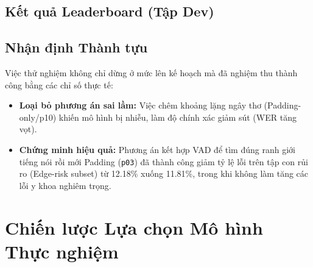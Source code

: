 \documentclass[12pt,a4paper]{article}
\begin{document}
\subsection{Kết quả Leaderboard (Tập Dev)}

\begin{table}[h]
\centering
\caption{Kết quả chạy ChunkFormer trên các biến thể tiền xử lý}
\end{table}

\subsection{Nhận định Thành tựu}
Việc thử nghiệm không chỉ dừng ở mức lên kế hoạch mà đã nghiệm thu thành công bằng các chỉ số thực tế:
\begin{itemize}[leftmargin=1.2cm]
    \item \textbf{Loại bỏ phương án sai lầm:} Việc chêm khoảng lặng ngây thơ (Padding-only/p10) khiến mô hình bị nhiễu, làm độ chính xác giảm sút (WER tăng vọt).
    \item \textbf{Chứng minh hiệu quả:} Phương án kết hợp VAD để tìm đúng ranh giới tiếng nói rồi mới Padding (\texttt{p03}) đã thành công giảm tỷ lệ lỗi trên tập con rủi ro (Edge-risk subset) từ 12.18\% xuống 11.81\%, trong khi không làm tăng các lỗi y khoa nghiêm trọng.
\end{itemize}

\section{Chiến lược Lựa chọn Mô hình Thực nghiệm}
\end{document}
